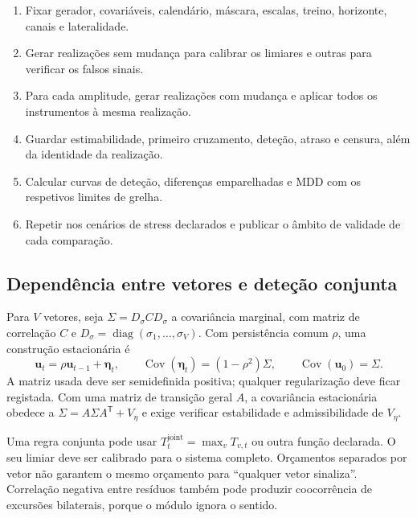 \begin{tcolorbox}[breakable,colback=black!2,colframe=black!45,title={Algoritmo G.3 --- Avaliação com verdade conhecida}]
\begin{enumerate}[leftmargin=*,nosep]
\item Fixar gerador, covariáveis, calendário, máscara, escalas, treino, horizonte, canais e lateralidade.
\item Gerar realizações sem mudança para calibrar os limiares e outras para verificar os falsos sinais.
\item Para cada amplitude, gerar realizações com mudança e aplicar todos os instrumentos à mesma realização.
\item Guardar estimabilidade, primeiro cruzamento, deteção, atraso e censura, além da identidade da realização.
\item Calcular curvas de deteção, diferenças emparelhadas e MDD com os respetivos limites de grelha.
\item Repetir nos cenários de stress declarados e publicar o âmbito de validade de cada comparação.
\end{enumerate}
\end{tcolorbox}

\subsection{Dependência entre vetores e deteção conjunta}
\label{sec:mat-simulacao-conjunta}
Para $V$ vetores, seja $\Sigma=D_\sigma C D_\sigma$ a covariância marginal, com matriz de correlação $C$ e $D_\sigma=\operatorname{diag}(\sigma_1,\ldots,\sigma_V)$. Com persistência comum $\rho$, uma construção estacionária é
\begin{equation}
\boldsymbol u_t=\rho\boldsymbol u_{t-1}+\boldsymbol\eta_t,
\qquad \operatorname{Cov}(\boldsymbol\eta_t)=(1-\rho^2)\Sigma,
\qquad \operatorname{Cov}(\boldsymbol u_0)=\Sigma.
\label{eq:mat-ar-multivariado}
\end{equation}
A matriz usada deve ser semidefinida positiva; qualquer regularização deve ficar registada. Com uma matriz de transição geral $A$, a covariância estacionária obedece a $\Sigma=A\Sigma A^{\mathsf T}+V_\eta$ e exige verificar estabilidade e admissibilidade de $V_\eta$.

Uma regra conjunta pode usar $T_t^{\mathrm{joint}}=\max_vT_{v,t}$ ou outra função declarada. O seu limiar deve ser calibrado para o sistema completo. Orçamentos separados por vetor não garantem o mesmo orçamento para ``qualquer vetor sinaliza''. Correlação negativa entre resíduos também pode produzir coocorrência de excursões bilaterais, porque o módulo ignora o sentido.

